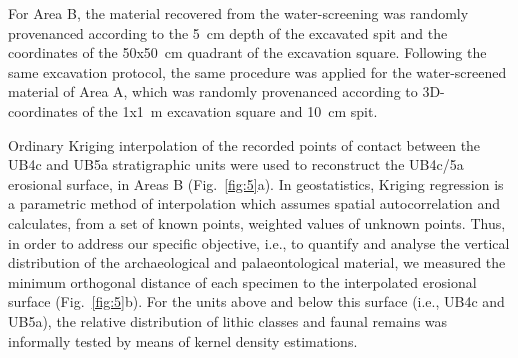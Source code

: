 \documentclass[preprint,authoryear,times]{elsarticle} %
\begin{document}
\begin{table}[]
  \caption{List of sampled observations for the vertical distribution and point pattern analyses.}
  \label{tab:2}
  \vspace{0.1in}
\end{table}

For Area B, the material recovered from the water-screening was randomly provenanced according to the 5~cm depth of the excavated spit and the coordinates of the 50x50~cm quadrant of the excavation square. Following the same excavation protocol, the same procedure was applied for the water-screened material of Area A, which was randomly provenanced according to 3D-coordinates of the 1x1~m excavation square and 10~cm spit.

Ordinary Kriging interpolation of the recorded points of contact between the UB4c and UB5a stratigraphic units were used to reconstruct the UB4c/5a erosional surface, in Areas B (Fig.~\ref{fig:5}a). In geostatistics, Kriging regression is a parametric method of interpolation which assumes spatial autocorrelation and calculates, from a set of known points, weighted values of unknown points. Thus, in order to address our specific objective, i.e., to quantify and analyse the vertical distribution of the archaeological and palaeontological material, we measured the minimum orthogonal distance of each specimen to the interpolated erosional surface (Fig.~\ref{fig:5}b). For the units above and below this surface (i.e., UB4c and UB5a), the relative distribution of lithic classes and faunal remains was informally tested by means of kernel density estimations.
\end{document}
